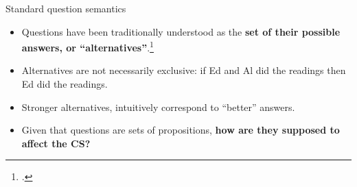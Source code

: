 \documentclass[10pt]{beamer}
\begin{document}
\begin{frame}{Standard question semantics}
	\begin{itemize}
		\item Questions have been traditionally understood as the \textbf{set of their possible answers, or ``alternatives''}.\footcite{Hamblin1973,Karttunen1977}
	\end{itemize}
	\begin{exe}
	\end{exe}\pause
	\begin{itemize}
		\item Alternatives are not necessarily exclusive: if Ed and Al did the readings then Ed did the readings.\pause
		\item Stronger alternatives, intuitively correspond to ``better'' answers.\pause
		\item Given that questions are sets of propositions, \textbf{how are they supposed to affect the CS?}
	\end{itemize}
	
\end{frame}
\end{document}
